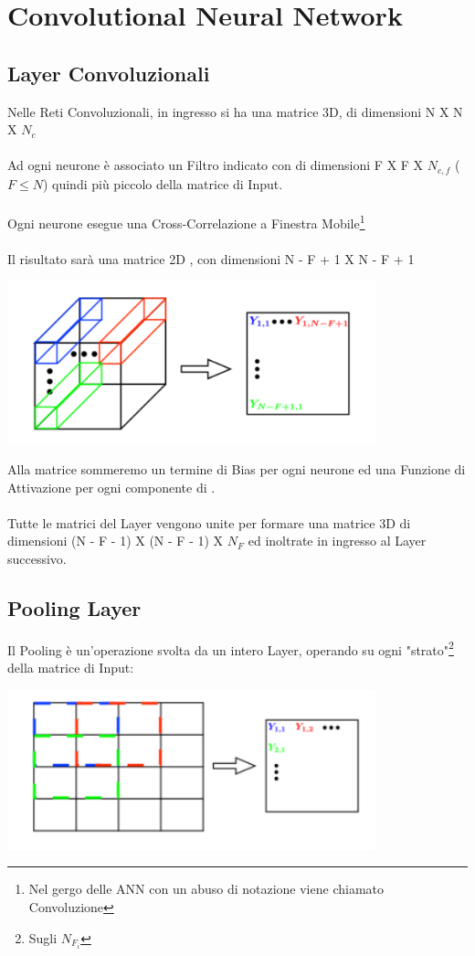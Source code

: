 \section{Convolutional Neural Network}
\subsection{Layer Convoluzionali}
Nelle Reti Convoluzionali, in ingresso si ha una matrice 3D, di dimensioni N X N X $N_c$\\ \\
Ad ogni neurone è associato un Filtro indicato con  di dimensioni F X F X $N_{c,f}$ ($F \leq N$) quindi più piccolo della matrice di Input.\\ \\
Ogni neurone esegue una Cross-Correlazione a Finestra Mobile\footnote{Nel gergo delle ANN con un abuso di notazione viene chiamato Convoluzione}\\ \\
Il risultato sarà una matrice 2D , con dimensioni N - F + 1 X N - F + 1

\includegraphics[width=0.8\textwidth]{Images/Convolutional.png}

Alla matrice  sommeremo un termine di Bias per ogni neurone ed una Funzione di Attivazione per ogni componente di .\\ \\

Tutte le matrici  del Layer vengono unite per formare una matrice 3D di dimensioni (N - F - 1) X (N - F - 1) X $N_F$  ed inoltrate in ingresso al Layer successivo.

\subsection{Pooling Layer}
Il Pooling è un'operazione svolta da un intero Layer, operando su ogni "strato"\footnote{Sugli $N_{F_i}$} della matrice di Input:
\begin{center}
    \includegraphics[width=0.8\textwidth]{Images/Pooling.png}
\end{center}

